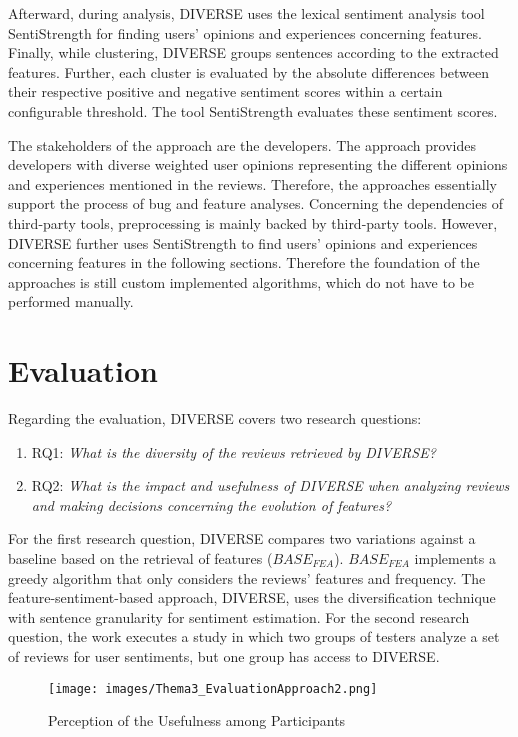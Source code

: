 Afterward, during analysis, DIVERSE uses the lexical sentiment analysis tool SentiStrength for finding users’ opinions and experiences concerning features. Finally, while clustering, DIVERSE groups sentences according to the extracted features. Further, each cluster is evaluated by the absolute differences between their respective positive and negative sentiment scores within a certain configurable threshold. The tool SentiStrength evaluates these sentiment scores.

The stakeholders of the approach are the developers. The approach provides developers with diverse weighted user opinions representing the different opinions and experiences mentioned in the reviews. Therefore, the approaches essentially support the process of bug and feature analyses. Concerning the dependencies of third-party tools, preprocessing is mainly backed by third-party tools. However, DIVERSE further uses SentiStrength to find users’ opinions and experiences concerning features in the following sections. Therefore the foundation of the approaches is still custom implemented algorithms, which do not have to be performed manually.

\section{Evaluation}
Regarding the evaluation, DIVERSE covers two research questions:

\begin{enumerate}
    \item RQ1: \textit{What is the diversity of the reviews retrieved by DIVERSE?}
    \item RQ2: \textit{What is the impact and usefulness of DIVERSE when analyzing reviews and making decisions concerning the evolution of features?}
\end{enumerate}

For the first research question, DIVERSE compares two variations against a baseline based on the retrieval of features ($BASE_{FEA}$). $BASE_{FEA}$ implements a greedy algorithm that only considers the reviews’ features and frequency. The feature-sentiment-based approach, DIVERSE, uses the diversification technique with sentence granularity for sentiment estimation. For the second research question, the work executes a study in which two groups of testers analyze a set of reviews for user sentiments, but one group has access to DIVERSE.

\begin{figure}
\centering
\texttt{[image: images/Thema3\_EvaluationApproach2.png]}
\caption{Perception of the Usefulness among Participants \cite{Guzman}}
\label{fig:evaluationApproach2}
\end{figure}

